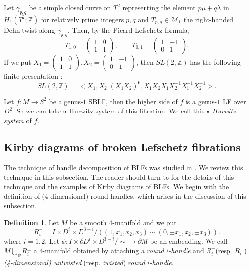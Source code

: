 \documentclass{amsart}
\theoremstyle{plain}
\theoremstyle{definition}
\newtheorem{defn}[thm]{Definition}
\begin{document}
Let $\gamma_{p,q}$ be a simple closed curve on $T^2$ representing the element $p\mu+q\lambda$ in $H_1(T^2;\mathbb{Z})$ for relatively prime integers $p,q$ 
and $T_{p,q}\in\mathcal{M}_1$ the right-handed Dehn twist along $\gamma_{p,q}$. 
Then, by the Picard-Lefschetz formula, 
\[
T_{1,0}=
\begin{pmatrix}
1 & 0 \\
1 & 1 
\end{pmatrix}, 
\hspace{2em}
T_{0,1}=
\begin{pmatrix}
1 & -1 \\
0 & 1
\end{pmatrix}. 
\]
If we put $X_1=
\begin{pmatrix}
1 & 0 \\
1 & 1 
\end{pmatrix}
,X_2=
\begin{pmatrix}
1 & -1 \\
0 & 1
\end{pmatrix}
$, then $SL(2,\mathbb{Z})$ has the following finite presentation \cite{MKS}:
\[
SL(2,\mathbb{Z})=<X_1,X_2|(X_1X_2)^6,X_1X_2X_1X_2^{-1}X_1^{-1}X_2^{-1}>. 
\]

Let $f:M\rightarrow S^2$ be a genus-$1$ SBLF, then the higher side of $f$ is a genus-$1$ LF over $D^2$.
So we can take a Hurwitz system of this fibration. 
We call this a {\it Hurwitz system} of $f$.


\subsection{Kirby diagrams of broken Lefschetz fibrations}\label{Kirby diagrams of BLF}
The technique of handle decomposition of BLFs was studied in \cite{Ba2}. 
We review this technique in this subsection. 
The reader should turn to \cite{Ba2} for the details of this technique and the examples of Kirby diagrams of BLFs.
We begin with the definition of ($4$-dimensional) round handles, which arises in the discussion of this subsection. 

\begin{defn}
Let $M$ be a smooth $4$-manifold and we put 
\[
R_{i}^{\pm}=I\times D^i\times D^{3-i}/((1,x_1,x_2,x_3)\sim(0,\pm x_1,x_2,\pm x_3)). 
\] 
where $i=1,2$.
Let $\psi:I\times \partial D^i\times D^{3-i}/\sim\rightarrow \partial M$ be an embedding. 
We call $M\bigcup_{\psi}R_{i}^{\pm}$ a $4$-manifold obtained by attaching a {\it round $i$-handle} and $R_{i}^{+}$(resp. $R_{i}^{-}$) {\it (4-dimensional) untwisted} (resp. {\it twisted}) {\it round $i$-handle}. 
\end{defn}
\end{document}

